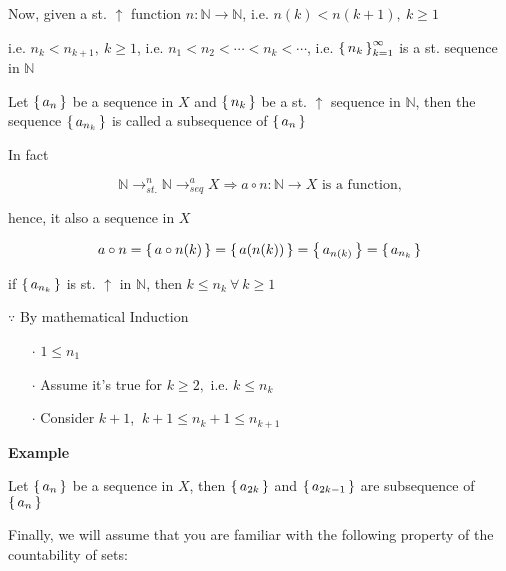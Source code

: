 Now, given a st. $\uparrow$ function $n:\mathbb N \rightarrow \mathbb N$, i.e. $n(k) < n(k+1),~k \geq 1$

i.e. $n_k < n_{k+1},~k \geq 1$, i.e. $n_1<n_2<\cdots<n_k<\cdots$, i.e. $\left\{ \,n_k \,\right\}^{\infty}_{k=1}$ is a st. sequence in $\mathbb N$

\newpage

\begin{defn}
	Let $\left\{ \,a_n \,\right\}$ be a sequence in $X$ and $\left\{ \,n_k \,\right\}$ be a st. $\uparrow$ sequence in $\mathbb N$, then the sequence $\left\{ \,a_{n_k} \,\right\}$ is called a subsequence of $\left\{ \,a_n \,\right\}$
	
	In fact
	
	$$\mathbb N \rightarrow^{n}_{st.} \mathbb N \rightarrow^{a}_{seq} X  \Rightarrow a \circ n:\mathbb N \rightarrow X \text{ is a function,}$$
	
	hence, it also a sequence in $X$
	
	$$a \circ n = \left\{ \,a \circ n(k) \,\right\} = \left\{ \,a(n(k)) \,\right\} = \left\{ \,a_{n(k)} \,\right\} = \left\{ \,a_{n_k} \,\right\}$$
\end{defn}

\begin{rmk*}
	if $\left\{ \,a_{n_k} \,\right\}$ is st. $\uparrow$ in $\mathbb N$, then $k \leq n_k~\forall~k\geq 1$
	
	$\because$ By mathematical Induction
	
	\begin{enumerate}
		\item[$\cdot$] $1 \leq n_1$
		\item[$\cdot$] Assume it's true for $k \geq 2,$ i.e. $k \leq n_k$
		\item[$\cdot$] Consider $k+1$, $~k+1 \leq n_k + 1 \leq n_{k+1}$ 
	\end{enumerate}
	
	\textbf{Example}
	
	Let $\left\{ \,a_n \,\right\}$ be a sequence in $X$, then $\left\{ \,a_{2k} \,\right\}$ and $\left\{ \,a_{2k-1} \,\right\}$ are subsequence of $\left\{ \,a_n \,\right\}$
\end{rmk*}

Finally, we will assume that you are familiar with the following property of the countability of sets:

